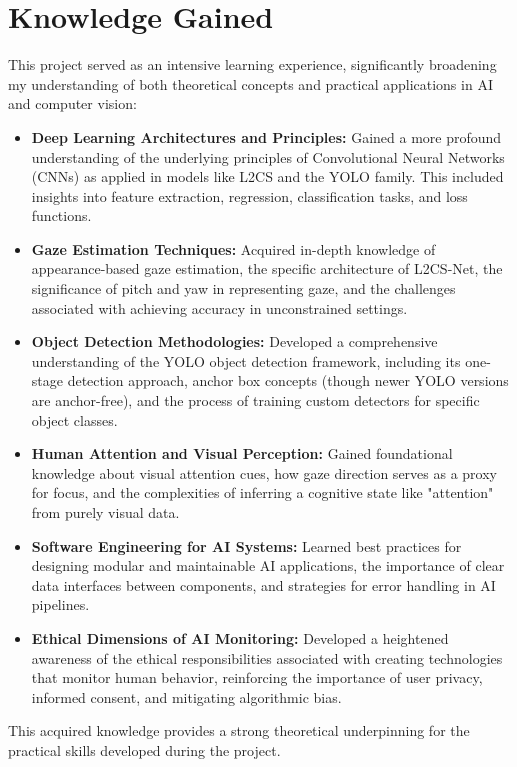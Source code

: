 \section{Knowledge Gained}
This project served as an intensive learning experience, significantly broadening my understanding of both theoretical concepts and practical applications in AI and computer vision:
\begin{itemize}
    \item \textbf{Deep Learning Architectures and Principles:} Gained a more profound understanding of the underlying principles of Convolutional Neural Networks (CNNs) as applied in models like L2CS and the YOLO family. This included insights into feature extraction, regression, classification tasks, and loss functions.
    \item \textbf{Gaze Estimation Techniques:} Acquired in-depth knowledge of appearance-based gaze estimation, the specific architecture of L2CS-Net, the significance of pitch and yaw in representing gaze, and the challenges associated with achieving accuracy in unconstrained settings.
    \item \textbf{Object Detection Methodologies:} Developed a comprehensive understanding of the YOLO object detection framework, including its one-stage detection approach, anchor box concepts (though newer YOLO versions are anchor-free), and the process of training custom detectors for specific object classes.
    \item \textbf{Human Attention and Visual Perception:} Gained foundational knowledge about visual attention cues, how gaze direction serves as a proxy for focus, and the complexities of inferring a cognitive state like "attention" from purely visual data.
    \item \textbf{Software Engineering for AI Systems:} Learned best practices for designing modular and maintainable AI applications, the importance of clear data interfaces between components, and strategies for error handling in AI pipelines.
    \item \textbf{Ethical Dimensions of AI Monitoring:} Developed a heightened awareness of the ethical responsibilities associated with creating technologies that monitor human behavior, reinforcing the importance of user privacy, informed consent, and mitigating algorithmic bias.
\end{itemize}
This acquired knowledge provides a strong theoretical underpinning for the practical skills developed during the project.

